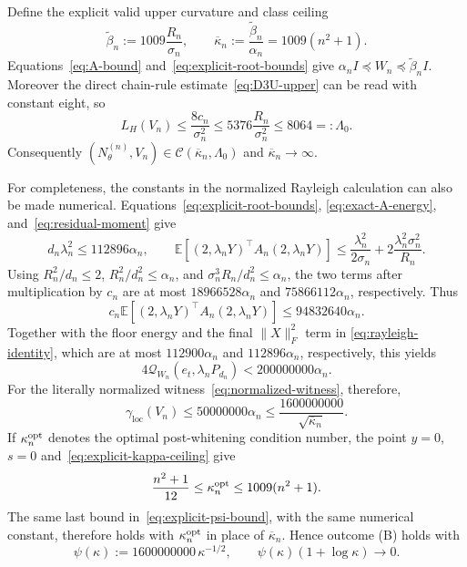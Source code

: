 \documentclass[11pt]{article}
\numberwithin{equation}{section}
\newcommand{\E}{\mathbb E}
\newcommand{\loc}{\mathrm{loc}}
\begin{document}
Define the explicit valid upper curvature and class ceiling
\begin{equation}\label{eq:explicit-kappa-ceiling}
 \widetilde\beta_n:=1009\frac{R_n}{\sigma_n},\qquad
 \overline\kappa_n:=\frac{\widetilde\beta_n}{\alpha_n}
 =1009(n^2+1).
\end{equation}
Equations~\eqref{eq:A-bound} and~\eqref{eq:explicit-root-bounds} give
$\alpha_nI\preceq W_n\preceq\widetilde\beta_nI$.  Moreover the direct
chain-rule estimate~\eqref{eq:D3U-upper} can be read with constant eight, so
\begin{equation}\label{eq:explicit-Lambda}
 L_H(V_n)\le\frac{8c_n}{\sigma_n^2}
 \le5376\frac{R_n}{\sigma_n^2}\le8064=:\Lambda_0.
\end{equation}
Consequently $(N_\theta^{(n)},V_n)\in
\mathcal C(\overline\kappa_n,\Lambda_0)$ and
$\overline\kappa_n\to\infty$.

For completeness, the constants in the normalized Rayleigh calculation can
also be made numerical.  Equations~\eqref{eq:explicit-root-bounds},
\eqref{eq:exact-A-energy}, and~\eqref{eq:residual-moment} give
\[
 d_n\lambda_n^2\le112896\alpha_n,\qquad
 \E[(2,\lambda_nY)^\top A_n(2,\lambda_nY)]
 \le\frac{\lambda_n^2}{2\sigma_n}
 +2\frac{\lambda_n^2\sigma_n^2}{R_n}.
\]
Using $R_n^2/d_n\le2$, $R_n^2/d_n^2\le\alpha_n$, and
$\sigma_n^3R_n/d_n^2\le\alpha_n$, the two terms after multiplication by
$c_n$ are at most $18966528\alpha_n$ and $75866112\alpha_n$,
respectively.  Thus
\[
 c_n\E[(2,\lambda_nY)^\top A_n(2,\lambda_nY)]
 \le94832640\alpha_n.
\]
Together with the floor energy and the final $\|X\|_F^2$ term in
\eqref{eq:rayleigh-identity}, which are at most $112900\alpha_n$ and
$112896\alpha_n$, respectively, this yields
\[
 4\mathcal Q_{W_n}(e_t,\lambda_nP_{d_n})<200000000\alpha_n.
\]
For the literally normalized witness~\eqref{eq:normalized-witness}, therefore,
\begin{equation}\label{eq:explicit-psi-bound}
 \gamma_{\loc}(V_n)\le50000000\alpha_n
 \le\frac{1600000000}{\sqrt{\overline\kappa_n}}.
\end{equation}
If $\kappa_n^{\rm opt}$ denotes the optimal post-whitening condition number,
the point $y=0$, $s=0$ and~\eqref{eq:explicit-kappa-ceiling} give
\begin{equation}\label{eq:optimal-kappa-comparison}
 \frac{n^2+1}{12}\le\kappa_n^{\rm opt}
 \le1009(n^2+1).
\end{equation}
The same last bound in~\eqref{eq:explicit-psi-bound}, with the same numerical
constant, therefore holds with $\kappa_n^{\rm opt}$ in place of
$\overline\kappa_n$.  Hence outcome (B) holds with
\begin{equation}\label{eq:psi}
 \psi(\kappa):=1600000000\,\kappa^{-1/2},\qquad
 \psi(\kappa)(1+\log\kappa)\longrightarrow0.
\end{equation}
\end{document}

